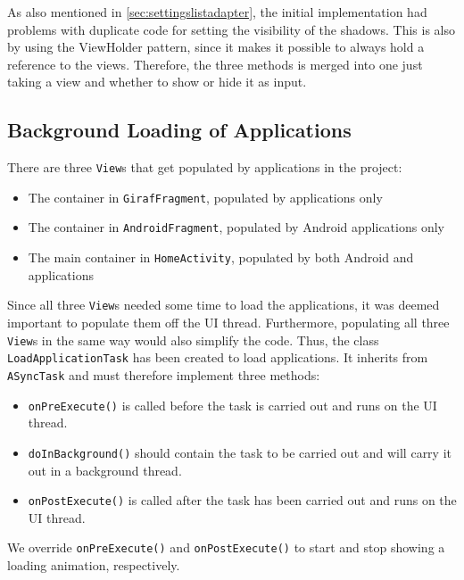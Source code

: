 As also mentioned in \cref{sec:settingslistadapter}, the initial implementation had problems with duplicate code for setting the visibility of the shadows.
This is also by using the ViewHolder pattern, since it makes it possible to always hold a reference to the views. 
Therefore, the three methods is merged into one just taking a view and whether to show or hide it as input.


\subsection{Background Loading of Applications}\label{sec:sprint4:dev:loadapplicationtask}
There are three \lstinline!View!s that get populated by applications in the \launcher project:

\begin{itemize}
\item The container in \lstinline!GirafFragment!, populated by \giraf applications only
\item The container in \lstinline!AndroidFragment!, populated by Android applications only
\item The main container in \lstinline!HomeActivity!, populated by both Android and \giraf applications
\end{itemize}

Since all three \lstinline!View!s needed some time to load the applications, it was deemed important to populate them off the UI thread.
Furthermore, populating all three \lstinline!View!s in the same way would also simplify the code.
Thus, the class \lstinline!LoadApplicationTask! has been created to load applications. 
It inherits from \lstinline!ASyncTask! and must therefore implement three methods:

\begin{itemize}
\item \lstinline!onPreExecute()! is called before the task is carried out and runs on the UI thread.
\item \lstinline!doInBackground()! should contain the task to be carried out and will carry it out in a background thread.
\item \lstinline!onPostExecute()! is called after the task has been carried out and runs on the UI thread.
\end{itemize}

We override \lstinline!onPreExecute()! and \lstinline!onPostExecute()! to start and stop showing a loading animation, respectively.

